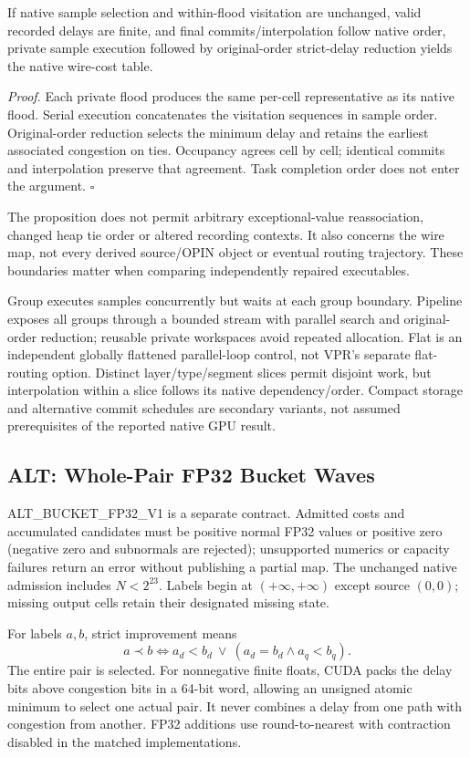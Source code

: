 \begin{proposition}
If native sample selection and within-flood visitation are unchanged, valid recorded delays are finite, and final commits/interpolation follow native order, private sample execution followed by original-order strict-delay reduction yields the native wire-cost table.
\end{proposition}
\noindent\emph{Proof.} Each private flood produces the same per-cell representative as its native flood. Serial execution concatenates the visitation sequences in sample order. Original-order reduction selects the minimum delay and retains the earliest associated congestion on ties. Occupancy agrees cell by cell; identical commits and interpolation preserve that agreement. Task completion order does not enter the argument. $\square$

The proposition does not permit arbitrary exceptional-value reassociation, changed heap tie order or altered recording contexts. It also concerns the wire map, not every derived source/OPIN object or eventual routing trajectory. These boundaries matter when comparing independently repaired executables.

Group executes samples concurrently but waits at each group boundary. Pipeline exposes all groups through a bounded stream with parallel search and original-order reduction; reusable private workspaces avoid repeated allocation. Flat is an independent globally flattened parallel-loop control, not VPR's separate flat-routing option. Distinct layer/type/segment slices permit disjoint work, but interpolation within a slice follows its native dependency/order. Compact storage and alternative commit schedules are secondary variants, not assumed prerequisites of the reported native GPU result.

\subsection{ALT: Whole-Pair FP32 Bucket Waves}
ALT\_BUCKET\_FP32\_V1 is a separate contract. Admitted costs and accumulated candidates must be positive normal FP32 values or positive zero (negative zero and subnormals are rejected); unsupported numerics or capacity failures return an error without publishing a partial map. The unchanged native admission includes $N<2^{23}$. Labels begin at $(+\infty,+\infty)$ except source $(0,0)$; missing output cells retain their designated missing state.

For labels $a,b$, strict improvement means
\begin{equation}
a\prec b\iff a_d<b_d\ \lor\ (a_d=b_d\land a_q<b_q).
\end{equation}
The entire pair is selected. For nonnegative finite floats, CUDA packs the delay bits above congestion bits in a 64-bit word, allowing an unsigned atomic minimum to select one actual pair. It never combines a delay from one path with congestion from another. FP32 additions use round-to-nearest with contraction disabled in the matched implementations.

